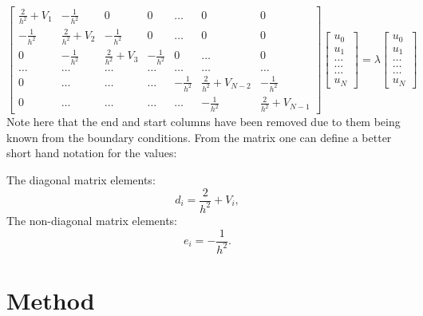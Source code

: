 \begin{equation}
	\begin{bmatrix} \frac{2}{h^2}+V_1 & -\frac{1}{h^2} & 0   & 0    & \dots  &0     & 0 \\
		-\frac{1}{h^2} & \frac{2}{h^2}+V_2 & -\frac{1}{h^2} & 0    & \dots  &0     &0 \\
		0   & -\frac{1}{h^2} & \frac{2}{h^2}+V_3 & -\frac{1}{h^2}  &0       &\dots & 0\\
		\dots  & \dots & \dots & \dots  &\dots      &\dots & \dots\\
		0   & \dots & \dots & \dots  &-\frac{1}{h^2}  &\frac{2}{h^2}+V_{N-2} & -\frac{1}{h^2}\\
		0   & \dots & \dots & \dots  &\dots       &-\frac{1}{h^2} & \frac{2}{h^2}+V_{N-1}
	\end{bmatrix}
 	 \begin{bmatrix} u_{0} \\
		u_{1} \\
		\dots\\ \dots\\ \dots\\
		u_{N}
	\end{bmatrix}=\lambda\begin{bmatrix} u_{0} \\
	u_{1} \\
	\dots\\ \dots\\ \dots\\
	u_{N}
	\end{bmatrix}
	\label{eq:matrixse} 
\end{equation}
Note here that the end and start columns have been removed due to them being known from the boundary conditions. From the matrix one can define a better short hand notation for the values:

The diagonal matrix elements:
\begin{equation*}
d_i=\frac{2}{h^2}+V_i,
\end{equation*}
The non-diagonal matrix elements:
\begin{equation*}
e_i=-\frac{1}{h^2}.
\end{equation*}

\section{Method}

















